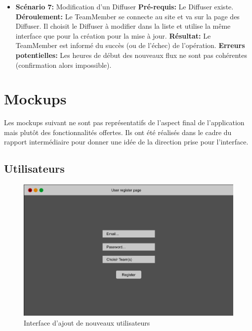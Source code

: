 \documentclass[french]{article}
\begin{document}
\begin{appendices}
\begin{itemize}
			\item \textbf{Scénario 7:} Modification d'un Diffuser \newline
			\textbf{Pré-requis:} Le Diffuser existe.\newline
			\textbf{Déroulement:} Le TeamMember se connecte au site et va sur la page des Diffuser. Il choisit le Diffuser à modifier dans la liste et utilise la même interface que pour la création pour la mise à jour. \newline
			\textbf{Résultat:} Le TeamMember est informé du succès (ou de l'échec) de l'opération.\newline
			\textbf{Erreurs potentielles:} Les heures de début des nouveaux flux ne sont pas cohérentes (confirmation alors impossible). \newline

		\end{itemize}
 
 
 \newpage		
\section{Mockups}
Les mockups suivant ne sont pas représentatifs de l'aspect final de l'application mais plutôt des fonctionnalités offertes. Ils ont été réalisés dans le cadre du rapport intermédiaire pour donner une idée de la direction prise pour l'interface.

\subsection{Utilisateurs}

	\begin{figure}[h]
		\centering
		\includegraphics[scale=0.3]{mockup/m_user_register}
		\caption{Interface d'ajout de nouveaux utilisateurs}
		\label{fig:userRegister}
	\end{figure}
	

\end{appendices}
\end{document}
